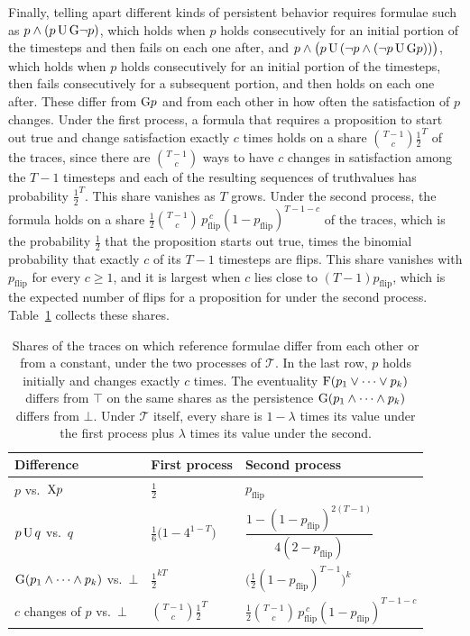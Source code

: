 \documentclass[titlepage,a4paper,11pt]{report}
\begin{document}
    Finally, telling apart different kinds of persistent behavior requires formulae such as $p\land(p\,\text{U}\,\text{G}\neg p)$, which holds when $p$ holds consecutively for an initial portion of the timesteps and then fails on each one after, and $p\land\bigl(p\,\text{U}\,(\neg p\land(\neg p\,\text{U}\,\text{G} p))\bigr)$, which holds when $p$ holds consecutively for an initial portion of the timesteps, then fails consecutively for a subsequent portion, and then holds on each one after. These differ from $\text{G} p$ and from each other in how often the satisfaction of $p$ changes. Under the first process, a formula that requires a proposition to start out true and change satisfaction exactly $c$ times holds on a share $\binom{T-1}{c}\frac12^{T}$ of the traces, since there are $\binom{T-1}{c}$ ways to have $c$ changes in satisfaction among the $T-1$ timesteps and each of the resulting sequences of truthvalues has probability $\frac12^{T}$. This share vanishes as $T$ grows. Under the second process, the formula holds on a share $\frac12\binom{T-1}{c}\,p_{\text{flip}}^{\,c}(1-p_{\text{flip}})^{T-1-c}$ of the traces, which is the probability $\frac12$ that the proposition starts out true, times the binomial probability that exactly $c$ of its $T-1$ timesteps are flips. This share vanishes with $p_{\text{flip}}$ for every $c\ge1$, and it is largest when $c$ lies close to $(T-1)p_{\text{flip}}$, which is the expected number of flips for a proposition for under the second process. Table~\ref{tab:reference_shares} collects these shares.
 
    \begin{table}[ht]
        \centering
        \caption{Shares of the traces on which reference formulae differ from each other or from a constant, under the two processes of $\mathcal T$. In the last row, $p$ holds initially and changes exactly $c$ times. The eventuality $\text{F}(p_1\lor\dots\lor p_k)$ differs from $\top$ on the same shares as the persistence $\text{G}(p_1\land\dots\land p_k)$ differs from $\bot$. Under $\mathcal T$ itself, every share is $1-\lambda$ times its value under the first process plus $\lambda$ times its value under the second.
        \vspace{15pt}}
        \label{tab:reference_shares}
        \begin{tabular}{lll}
            \toprule
            Difference & First process & Second process \\
            \midrule
            $p$ vs.\ $\text{X} p$ & $\frac12$ & $p_{\text{flip}}$ \\[4pt]
            $p\,\text{U}\,q$ vs.\ $q$ & $\frac16\bigl(1-4^{1-T}\bigr)$ & $\dfrac{1-(1-p_{\text{flip}})^{2(T-1)}}{4(2-p_{\text{flip}})}$ \\[10pt]
            $\text{G}(p_1\land\dots\land p_k)$ vs.\ $\bot$ & $\frac12^{kT}$ & $\bigl(\frac12(1-p_{\text{flip}})^{T-1}\bigr)^k$ \\[4pt]
            $c$ changes of $p$ vs.\ $\bot$ & $\binom{T-1}{c}\frac12^{T}$ & $\frac12\binom{T-1}{c}\,p_{\text{flip}}^{\,c}(1-p_{\text{flip}})^{T-1-c}$ \\
            \bottomrule
        \end{tabular}
    \end{table}
\end{document}
